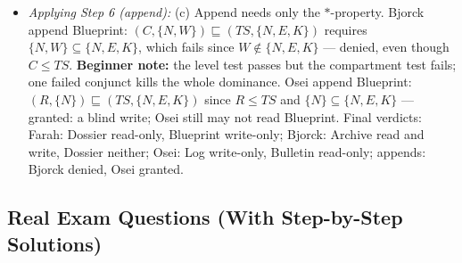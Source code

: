 \documentclass[12pt, a4paper]{article}
\newcommand{\term}[1]{\textbf{\textit{#1}}}        %
\begin{document}
\begin{itemize}
    \textbf{Beginner note:} equality counts as dominance in both directions ($\leq$, not $<$). Bjorck vs Dossier: read needs $\{N,E\} \subseteq \{N,W\}$ --- false ($E$ missing); write needs $\{N,W\} \subseteq \{N,E\}$ --- false ($W$ missing);
    the levels are equal but the compartment sets are \term{incomparable}, so neither read nor write. Osei vs Log: read needs $C \leq R$ --- false, denied (no read up); write needs $R \leq C$ and $\{N\} \subseteq \{N\}$ --- granted (write-up).
    Result: write-only. Osei vs Bulletin: read needs $U \leq R$ and $\{\} \subseteq \{N\}$ --- granted; write needs $R \leq U$ --- false, denied (no write down). Result: read-only.
    \item \textit{Applying Step 6 (append):} (c) Append needs only the $*$-property. Bjorck append Blueprint: $(C, \{N,W\}) \sqsubseteq (TS, \{N,E,K\})$ requires $\{N,W\} \subseteq \{N,E,K\}$, which fails since $W \notin \{N,E,K\}$ --- denied, even though $C \leq TS$.
    \textbf{Beginner note:} the level test passes but the compartment test fails; one failed conjunct kills the whole dominance.
    Osei append Blueprint: $(R, \{N\}) \sqsubseteq (TS, \{N,E,K\})$ since $R \leq TS$ and $\{N\} \subseteq \{N,E,K\}$ --- granted: a blind write; Osei still may not read Blueprint.
    Final verdicts: Farah: Dossier read-only, Blueprint write-only; Bjorck: Archive read and write, Dossier neither; Osei: Log write-only, Bulletin read-only; appends: Bjorck denied, Osei granted.
\end{itemize}

\subsection*{Real Exam Questions (With Step-by-Step Solutions)}
\end{document}
